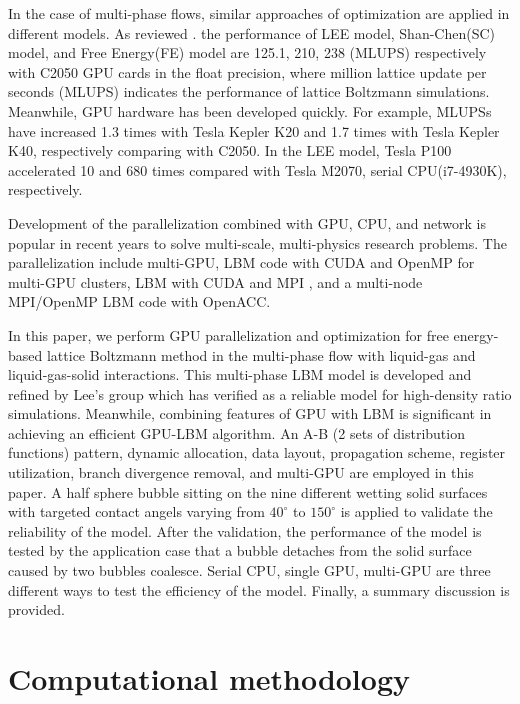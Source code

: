 \documentclass[10pt]{elsarticle}
\begin{document}
In the case of multi-phase flows, similar approaches of optimization are applied in different models. As reviewed \cite{rf:Navarro18}. the performance of  LEE model\cite{rf:Li13}, Shan-Chen(SC) model\cite{rf:Januszewski14}, and Free Energy(FE) model\cite{rf:Januszewski14} are 125.1, 210, 238 (MLUPS) respectively with C2050 GPU cards in the float precision, where million lattice update per seconds (MLUPS) indicates the performance of lattice
Boltzmann simulations.  Meanwhile, GPU hardware has been developed quickly. For example, MLUPSs have increased 1.3 times with Tesla Kepler K20 and 1.7 times with Tesla Kepler K40, respectively comparing with C2050\cite{rf:Januszewski14}. In the LEE model, Tesla P100 accelerated 10 and 680 times compared with Tesla M2070, serial CPU(i7-4930K), respectively\cite{rf:Huang18}. 

Development of the parallelization combined with GPU, CPU, and network is popular in recent years to solve multi-scale, multi-physics research problems. The parallelization include  multi-GPU\cite{rf:Obrecht13, rf:Zigon18}, LBM code with CUDA and OpenMP for multi-GPU clusters\cite{rf:Myre11}, LBM with CUDA and MPI \cite{rf:Xian11}, and a multi-node MPI/OpenMP LBM code with OpenACC\cite{rf:Blair15}.

In this paper, we perform GPU parallelization and optimization for free energy-based lattice Boltzmann method in the multi-phase flow with liquid-gas and liquid-gas-solid interactions. This multi-phase LBM model is developed and refined by Lee's group \cite{rf:Lee05,rf:Lee06,rf:Lee09,rf:Lee10} which has verified as a reliable model for high-density ratio simulations. Meanwhile, combining features of GPU with LBM is significant in achieving an efficient GPU-LBM algorithm. An A-B (2 sets of distribution functions) pattern, dynamic allocation, data layout, propagation scheme, register utilization, branch divergence removal, and multi-GPU are employed in this paper.  A half sphere bubble sitting on the nine different wetting solid surfaces with targeted contact angels varying from $40^\circ$ to $150^\circ$ is applied to validate the reliability of the model. After the validation, the performance of the model is tested by the application case that a bubble detaches from the solid surface caused by two bubbles coalesce. Serial CPU, single GPU, multi-GPU are three different ways to test the efficiency of the model. Finally, a summary discussion is provided. 

\section{Computational methodology}
\label{sec:LBE}
\end{document}
